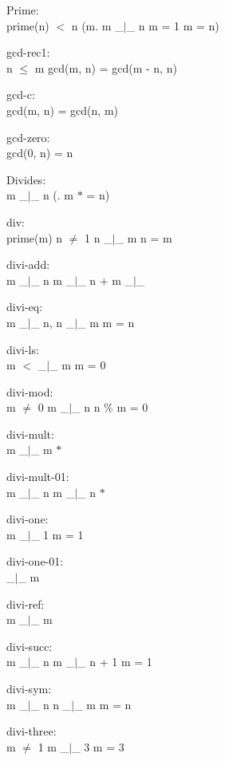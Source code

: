 \documentclass[a4paper]{article}
\begin{document}
\raggedright
              
Prime:\\ \Fol prime(n)  $<$ n \And (\All m. m \_$|$\_ n \Imp m = 1 \Or m = n)

gcd-rec1:\\ \Fol n $\le$ m \Imp gcd(m, n) = gcd(m - n, n)

gcd-c:\\ \Fol gcd(m, n) = gcd(n, m)

gcd-zero:\\ \Fol gcd(0, n) = n

Divides:\\ \Fol m \_$|$\_ n \Equiv (\Ex {}. m $*$  = n)

div:\\ \Fol prime(m) \And n $\neq$ 1 \Imp n \_$|$\_ m \Equiv n = m

divi-add:\\ \Fol m \_$|$\_ n \Imp m \_$|$\_ n +  \Equiv m \_$|$\_ 

divi-eq:\\m \_$|$\_ n, n \_$|$\_ m \Fol m = n

divi-ls:\\ \Fol m $<$  \Imp {} \_$|$\_ m \Equiv m = 0

divi-mod:\\m $\neq$ 0 \Fol m \_$|$\_ n \Equiv n \% m = 0

divi-mult:\\ \Fol m \_$|$\_ m $*$ 

divi-mult-01:\\ \Fol m \_$|$\_ n \Imp m \_$|$\_ n $*$ 

divi-one:\\ \Fol m \_$|$\_ 1 \Equiv m = 1

divi-one-01:\\  \_$|$\_ m

divi-ref:\\ \Fol m \_$|$\_ m

divi-succ:\\ \Fol m \_$|$\_ n \Imp m \_$|$\_ n + 1 \Equiv m = 1

divi-sym:\\ \Fol m \_$|$\_ n \Imp n \_$|$\_ m \Equiv m = n

divi-three:\\ \Fol m $\neq$ 1 \Imp m \_$|$\_ 3 \Equiv m = 3
\end{document}
